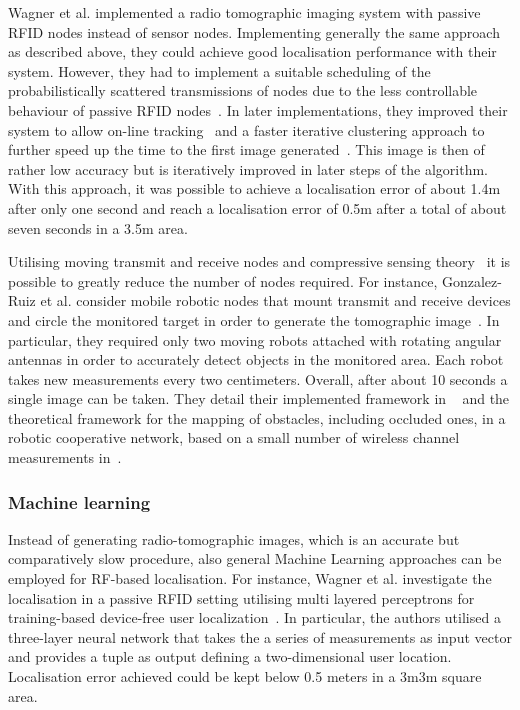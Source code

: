 \documentclass[journal]{IEEEtran}
\begin{document}
\begin{figure*}
Wagner et al. implemented a radio tomographic imaging system with passive RFID nodes instead of sensor nodes. 
Implementing generally the same approach as described above, they could achieve good localisation performance with their system. 
However, they had to implement a suitable scheduling of the probabilistically scattered transmissions of nodes due to the less controllable behaviour of passive RFID nodes~\cite{DeviceFreeRecognition_Wagner_2012}.
In later implementations, they improved their system to allow on-line tracking~\cite{DeviceFreeRecognition_Wagner_2013-2} and a faster iterative clustering approach to further speed up the time to the first image generated~\cite{DeviceFreeRecognition_Wagner_2013}. 
This image is then of rather low accuracy but is iteratively improved in later steps of the algorithm. 
With this approach, it was possible to achieve a localisation error of about 1.4m after only one second and reach a localisation error of 0.5m after a total of about seven seconds in a 3.5m area.

Utilising moving transmit and receive nodes and compressive sensing theory~\cite{CompressiveSensing_Candes_2006,CompressiveSensing_Donoho_2006,CompressiveSensing_Needell_2010} it is possible to greatly reduce the number of nodes required.
For instance, Gonzalez-Ruiz et al. consider mobile robotic nodes that mount transmit and receive devices and circle the monitored target in order to generate the tomographic image~\cite{RFSensing_Gonzalez_2013}.
In particular, they required only two moving robots attached with rotating angular antennas in order to accurately detect objects in the monitored area.  
Each robot takes new measurements every two centimeters. 
Overall, after about 10 seconds a single image can be taken.
They detail their implemented framework in ~\cite{RFSensing_Gonzalez_2014} and the theoretical framework for the mapping of obstacles, including occluded ones, in a robotic cooperative network, based on a small number of wireless channel measurements in~\cite{RFSensing_Mostofi_2013}.
 
\subsubsection{Machine learning}
Instead of generating radio-tomographic images, which is an accurate but comparatively slow procedure, also general Machine Learning approaches can be employed for RF-based localisation.
For instance, Wagner et al. investigate the localisation in a passive RFID setting utilising multi layered perceptrons for training-based device-free user localization~\cite{DeviceFreeRecognition_Wagner_2012-2}.
In particular, the authors utilised a three-layer neural network that takes the a series of measurements as input vector and provides a tuple as output defining a two-dimensional user location.
Localisation error achieved could be kept below 0.5 meters in a 3m3m square area.


\end{figure*}
\end{document}
